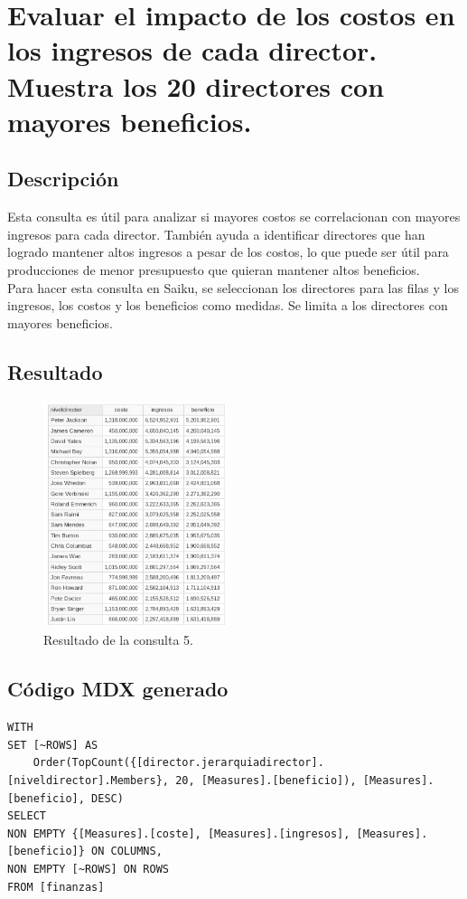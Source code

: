 \documentclass[11pt]{opticajnl}
\begin{document}
\newpage


\section{Evaluar el impacto de los costos en los ingresos de cada director. Muestra los 20 directores con mayores beneficios.}

\subsection{Descripción}

Esta consulta es útil para analizar si mayores costos se correlacionan con mayores ingresos para cada director. También ayuda a identificar directores que han logrado mantener altos ingresos a pesar de los costos, lo que puede ser útil para producciones de menor presupuesto que quieran mantener altos beneficios. \\

Para hacer esta consulta en Saiku, se seleccionan los directores para las filas y los ingresos, los costos y los beneficios como medidas. Se limita a los directores con mayores beneficios.

\subsection{Resultado}

\begin{figure}[h]
\centering
\includegraphics[width=0.48\textwidth]{fotos/con5.jpg}
\caption{Resultado de la consulta 5.}
\end{figure}

\subsection{Código MDX generado}

\begin{lstlisting}[style=terminal]
WITH
SET [~ROWS] AS
	Order(TopCount({[director.jerarquiadirector].[niveldirector].Members}, 20, [Measures].[beneficio]), [Measures].[beneficio], DESC)
SELECT
NON EMPTY {[Measures].[coste], [Measures].[ingresos], [Measures].[beneficio]} ON COLUMNS,
NON EMPTY [~ROWS] ON ROWS
FROM [finanzas]
\end{lstlisting}
\end{document}
